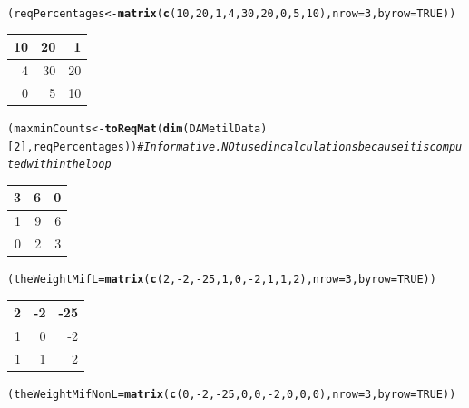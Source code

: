 \documentclass[a4paper,10pt]{article}\usepackage[]{graphicx}\usepackage[]{xcolor}
\makeatletter
\newcommand{\hlnum}[1]{\textcolor[rgb]{0.686,0.059,0.569}{#1}}%
\newcommand{\hlcom}[1]{\textcolor[rgb]{0.678,0.584,0.686}{\textit{#1}}}%
\newcommand{\hlopt}[1]{\textcolor[rgb]{0,0,0}{#1}}%
\newcommand{\hlstd}[1]{\textcolor[rgb]{0.345,0.345,0.345}{#1}}%
\newcommand{\hlkwb}[1]{\textcolor[rgb]{0.69,0.353,0.396}{#1}}%
\newcommand{\hlkwc}[1]{\textcolor[rgb]{0.333,0.667,0.333}{#1}}%
\newcommand{\hlkwd}[1]{\textcolor[rgb]{0.737,0.353,0.396}{\textbf{#1}}}%
\newenvironment{kframe}{%
 \def\at@end@of@kframe{}%
 \ifinner\ifhmode%
  \def\at@end@of@kframe{\end{minipage}}%
  \begin{minipage}{\columnwidth}%
 \fi\fi%
 \def\FrameCommand##1{\hskip\@totalleftmargin \hskip-\fboxsep
 \colorbox{shadecolor}{##1}\hskip-\fboxsep
     \hskip-\linewidth \hskip-\@totalleftmargin \hskip\columnwidth}%
 \MakeFramed {\advance\hsize-\width
   \@totalleftmargin\z@ \linewidth\hsize
   \@setminipage}}%
 {\par\unskip\endMakeFramed%
 \at@end@of@kframe}
\newenvironment{knitrout}{}{} %
\makeatother
\begin{document}
\begin{knitrout}
\color{fgcolor}\begin{kframe}
\begin{alltt}
\hlstd{(reqPercentages}   \hlkwb{<-} \hlkwd{matrix} \hlstd{(}\hlkwd{c}\hlstd{(}\hlnum{10}\hlstd{,} \hlnum{20}\hlstd{,} \hlnum{1}\hlstd{,} \hlnum{4}\hlstd{,} \hlnum{30}\hlstd{,} \hlnum{20}\hlstd{,} \hlnum{0}\hlstd{,} \hlnum{5}\hlstd{,} \hlnum{10}\hlstd{),} \hlkwc{nrow}\hlstd{=}\hlnum{3}\hlstd{,} \hlkwc{byrow}\hlstd{=}\hlnum{TRUE}\hlstd{))}
\end{alltt}
\end{kframe}


\begin{tabular}{r|r|r}
\hline
10 & 20 & 1\\
\hline
4 & 30 & 20\\
\hline
0 & 5 & 10\\
\hline
\end{tabular}\begin{kframe}\begin{alltt}
\hlstd{(maxminCounts} \hlkwb{<-} \hlkwd{toReqMat}\hlstd{(}\hlkwd{dim}\hlstd{(DAMetilData)[}\hlnum{2}\hlstd{], reqPercentages))} \hlcom{# Informative. NOt used in calculations because it is computed within the loop}
\end{alltt}
\end{kframe}


\begin{tabular}{r|r|r}
\hline
3 & 6 & 0\\
\hline
1 & 9 & 6\\
\hline
0 & 2 & 3\\
\hline
\end{tabular}\begin{kframe}\begin{alltt}
\hlstd{(theWeightMifL}\hlkwb{=}\hlkwd{matrix} \hlstd{(}\hlkwd{c}\hlstd{(}\hlnum{2}\hlstd{,}\hlopt{-}\hlnum{2}\hlstd{,}\hlopt{-}\hlnum{25}\hlstd{,}\hlnum{1}\hlstd{,}\hlnum{0}\hlstd{,}\hlopt{-}\hlnum{2}\hlstd{,}\hlnum{1}\hlstd{,}\hlnum{1}\hlstd{,}\hlnum{2}\hlstd{),} \hlkwc{nrow}\hlstd{=}\hlnum{3}\hlstd{,} \hlkwc{byrow}\hlstd{=}\hlnum{TRUE}\hlstd{))}
\end{alltt}
\end{kframe}


\begin{tabular}{r|r|r}
\hline
2 & -2 & -25\\
\hline
1 & 0 & -2\\
\hline
1 & 1 & 2\\
\hline
\end{tabular}\begin{kframe}\begin{alltt}
\hlstd{(theWeightMifNonL}\hlkwb{=}\hlkwd{matrix} \hlstd{(}\hlkwd{c}\hlstd{(}\hlnum{0}\hlstd{,}\hlopt{-}\hlnum{2}\hlstd{,}\hlopt{-}\hlnum{25}\hlstd{,}\hlnum{0}\hlstd{,}\hlnum{0}\hlstd{,}\hlopt{-}\hlnum{2}\hlstd{,}\hlnum{0}\hlstd{,}\hlnum{0}\hlstd{,}\hlnum{0}\hlstd{),} \hlkwc{nrow}\hlstd{=}\hlnum{3}\hlstd{,} \hlkwc{byrow}\hlstd{=}\hlnum{TRUE}\hlstd{))}
\end{alltt}
\end{kframe}



\end{knitrout}
\end{document}
